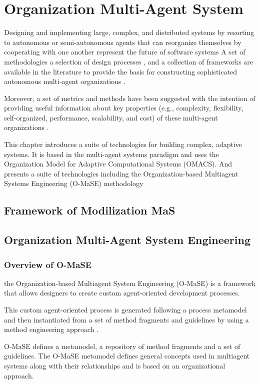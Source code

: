 
\chapter{\label{cha:org}Organization Multi-Agent System}

Designing and implementing large, complex, and distributed systems by resorting to autonomous 
or semi-autonomous agents that can reorganize themselves by  cooperating with one another 
represent the future of software systems   A set of  methodologies  a selection of design processes ,
and a collection of  frameworks are available in the literature to provide the basis for constructing 
sophisticated autonomous multi-agent organizations . \cite{omacs0} 
 
 
Moreover, a set of metrics and methods have been suggested with the intention of providing useful information 
about key properties (e.g., complexity, flexibility, self-organized, performance, scalability, and cost)
of these multi-agent organizations  .\cite{omacs0}

This chapter introduces a suite of technologies for building complex, adaptive systems. 
It is based in the multi-agent systems paradigm and uses the Organization Model for Adaptive 
Computational Systems  (OMACS). 
And presents a suite of technologies including  the Organization-based Multiagent Systems Engineering 
(O-MaSE) methodology \cite{omacs4}

\section*{ \Huge{Framework of Modilization MaS} }
\section{ Organization Multi-Agent System Engineering}
\subsection{ Overview of O-MaSE }
 the Organization-based Multiagent System Engineering (O-MaSE) is a framework that 
 allows designers to create custom agent-oriented development processes. 
 
This custom agent-oriented process is generated following a process metamodel 
and then instantiated from a set of method fragments and guidelines 
by using a method engineering approach . 

O-MaSE defines a metamodel, a repository of method fragments and a set of guidelines. 
The O-MaSE metamodel defines general concepts used in multiagent systems
along with their relationships and is based on an organizational approach. \cite{omacs6}
 
